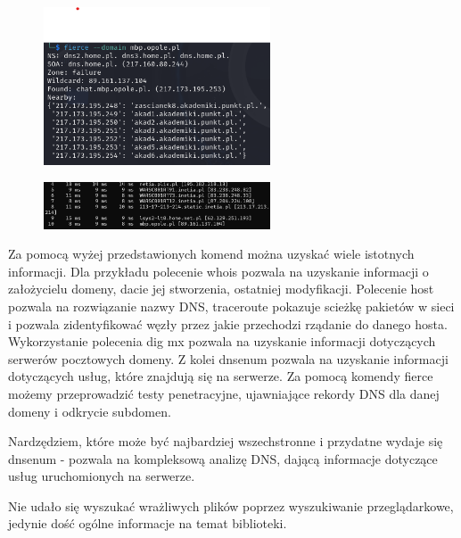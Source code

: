 \documentclass{article}
\begin{document}
\begin{figure}[H]
  \centering
  \includegraphics[width=0.6\textwidth]{fierce.png}
\end{figure}

\begin{figure}[H]
  \centering
  \includegraphics[width=0.6\textwidth]{traceroute.png}
\end{figure}


Za pomocą wyżej przedstawionych komend można uzyskać wiele istotnych informacji. 
Dla przykładu polecenie whois pozwala na uzyskanie informacji o założycielu domeny, dacie jej stworzenia, ostatniej modyfikacji.
Polecenie host pozwala na rozwiązanie nazwy DNS, traceroute pokazuje scieżkę pakietów w sieci i pozwala zidentyfikować węzły przez jakie przechodzi rządanie do danego hosta.
Wykorzystanie polecenia dig mx pozwala na uzyskanie informacji dotyczących serwerów pocztowych domeny. Z kolei dnsenum pozwala na uzyskanie informacji dotyczących usług, które znajdują się na serwerze.
Za pomocą komendy fierce możemy przeprowadzić testy penetracyjne, ujawniające rekordy DNS dla danej domeny i odkrycie subdomen. 

Nardzędziem, które może być najbardziej wszechstronne i przydatne wydaje się dnsenum - pozwala na kompleksową analizę DNS, dającą informacje
dotyczące usług uruchomionych na serwerze.

Nie udało się wyszukać wrażliwych plików poprzez wyszukiwanie przeglądarkowe, jedynie dość ogólne informacje na temat biblioteki.
\end{document}
